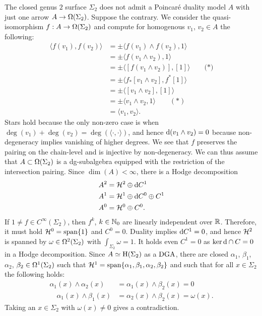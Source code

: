 \documentclass[\MainFolder/Text.tex]{subfiles}
\begin{document}
\begin{Example}\label{Ex:NoOneArrow}
\begin{ExampleList}
\item The closed genus $2$ surface $\Sigma_2$ does not admit a Poincar\'e duality model $A$ with just one arrow $A \rightarrow \Omega(\Sigma_2)$. Suppose the contrary. We consider the quasi-isomorphism $f:A\rightarrow \Omega(\Sigma_2)$ and compute for homogenous $v_1$, $v_2\in A$ the following:
\begin{align*}
\langle f(v_1),f(v_2)\rangle &= \pm \langle f(v_1)\wedge f(v_2),1 \rangle\\
&= \pm \langle f(v_1\wedge v_2),1 \rangle\\
&= \pm \langle [f(v_1\wedge v_2)],[1]\rangle\qquad\text{(*)}\\
&= \pm \langle f_*[v_1\wedge v_2], f^*[1] \rangle\\
&= \pm \langle [v_1\wedge v_2],[1]\rangle\\
&= \pm \langle v_1\wedge v_2, 1 \rangle\qquad(*) \\
&= \langle v_1, v_2 \rangle.
\end{align*}
Stars hold because the only non-zero case is when $\deg(v_1) + \deg(v_2) = \deg(\langle\cdot,\cdot\rangle)$, and hence $\mathrm{d} (v_1\wedge v_2) = 0$ because non-degeneracy implies vanishing of higher degrees. We see that $f$ preserves the pairing on the chain-level and is injective by non-degeneracy. We can thus assume that $A\subset\Omega(\Sigma_2)$ is a dg-subalgebra equipped with the restriction of the intersection pairing. Since $\dim(A)<\infty$, there is a Hodge decomposition
\begin{align*}
	A^2 &= \mathcal{H}^2 \oplus \mathrm{d} C^1\\
	A^1 &= \mathcal{H}^1 \oplus \mathrm{d} C^0 \oplus C^1\\
	A^0 &= \mathcal{H}^0 \oplus C^0.
\end{align*}
If $1\neq f\in C^{\infty}(\Sigma_2)$, then $f^k$, $k\in \mathbb{N}_0$ are linearly independent over $\mathbb{R}$. Therefore, it must hold $\mathcal{H}^0 = \mathrm{span}\{1\}$ and $C^0 = 0$. Duality implies $\mathrm{d} C^1 = 0$, and hence $\mathcal{H}^2$ is spanned by $\omega \in \Omega^2(\Sigma_2)$ with $\int_{\Sigma_2}\omega = 1$. It holds even $C^1=0$ as $\ker \mathrm{d} \cap C = 0$ in a Hodge decomposition. Since $A\simeq \mathrm{H}(\Sigma_2)$ as a $\mathrm{DGA}$, there are closed $\alpha_1$, $\beta_1$, $\alpha_2$, $\beta_2\in\Omega^1(\Sigma_2)$ such that $\mathcal{H}^1 = \mathrm{span}\{\alpha_1, \beta_1, \alpha_2, \beta_2\}$ and such that for all $x\in\Sigma_2$ the following holds:
\begin{align*}
	\alpha_1(x) \wedge \alpha_2(x) &=  \alpha_1(x) \wedge \beta_2(x) = 0\\
	\quad\alpha_1(x)\wedge\beta_1(x) &= \alpha_2(x)\wedge\beta_2(x) = \omega(x).
\end{align*}
Taking an $x\in \Sigma_2$ with $\omega(x) \neq 0$ gives a contradiction.


\end{ExampleList}
\end{Example}
\end{document}

